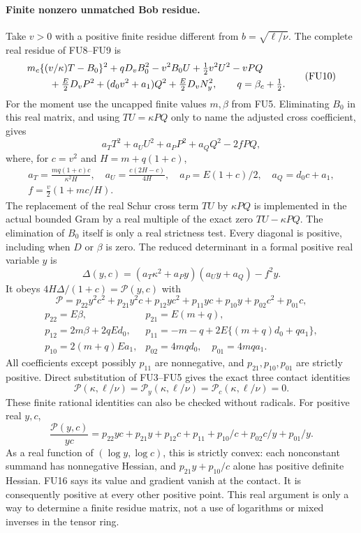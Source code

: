 \paragraph{Finite nonzero unmatched Bob residue.}
Take $v>0$ with a positive finite residue different from
$b=\sqrt{\ell/\nu}$. The complete real residue of FU8--FU9 is
\[
\begin{split}
 &m_c\{(v/\kappa)T-B_0\}^2+qD_vB_0^2-v^2B_0U
       +\tfrac12v^2U^2-vPQ\\
 &\hspace{8mm}+\tfrac E2D_vP^2+(d_0v^2+a_1)Q^2
             +\tfrac E2D_vN_y^2,\qquad q=\beta_c+\tfrac12.
\end{split}\tag{FU10}
\]
For the moment use the uncapped finite values $m,\beta$ from FU5.
Eliminating $B_0$ in this real matrix, and using $TU=\kappa PQ$
only to name the adjusted cross coefficient, gives
\[
 a_TT^2+a_UU^2+a_PP^2+a_QQ^2-2fPQ,
 \tag{FU11}
\]
where, for $c=v^2$ and $H=m+q(1+c)$,
\[
\begin{gathered}
 a_T=\frac{mq(1+c)c}{\kappa^2H},\quad
 a_U=\frac{c(2H-c)}{4H},\quad a_P=E(1+c)/2,\quad
 a_Q=d_0c+a_1,\\
 f=\frac{v}{2}(1+mc/H).
\end{gathered}\tag{FU12}
\]
The replacement of the real Schur cross term $TU$ by $\kappa PQ$
is implemented in the actual bounded Gram by a real multiple of
the exact zero $TU-\kappa PQ$. The elimination of $B_0$ itself
is only a real strictness test. Every diagonal is positive,
including when $D$ or $\beta$ is zero.
The reduced determinant in a formal positive real variable $y$ is
\[
 \Delta(y,c)=(a_T\kappa^2+a_Py)(a_Uy+a_Q)-f^2y.
 \tag{FU13}
\]
It obeys $4H\Delta/(1+c)=\mathcal P(y,c)$ with
\[
 \mathcal P=p_{22}y^2c^2+p_{21}y^2c+p_{12}yc^2
              +p_{11}yc+p_{10}y+p_{02}c^2+p_{01}c,
 \tag{FU14}
\]
\[
\begin{array}{ll}
 p_{22}=E\beta,&p_{21}=E(m+q),\\
 p_{12}=2m\beta+2qEd_0,&
 p_{11}=-m-q+2E\{(m+q)d_0+qa_1\},\\
 p_{10}=2(m+q)Ea_1,&p_{02}=4mqd_0,\quad p_{01}=4mqa_1.
\end{array}\tag{FU15}
\]
All coefficients except possibly $p_{11}$ are nonnegative, and
$p_{21},p_{10},p_{01}$ are strictly positive. Direct substitution of
FU3--FU5 gives the exact three contact identities
\[
 \mathcal P(\kappa,\ell/\nu)=
 \mathcal P_y(\kappa,\ell/\nu)=
 \mathcal P_c(\kappa,\ell/\nu)=0.
 \tag{FU16}
\]
These finite rational identities can also be checked without
radicals. For positive real $y,c$,
\[
 \frac{\mathcal P(y,c)}{yc}
 =p_{22}yc+p_{21}y+p_{12}c+p_{11}
                     +p_{10}/c+p_{02}c/y+p_{01}/y.
 \tag{FU17}
\]
As a real function of $(\log y,\log c)$, this is strictly convex:
each nonconstant summand has nonnegative Hessian, and
$p_{21}y+p_{10}/c$ alone has positive definite Hessian. FU16 says
its value and gradient vanish at the contact. It is consequently
positive at every other positive point. This real argument is only
a way to determine a finite residue matrix, not a use of logarithms
or mixed inverses in the tensor ring.

